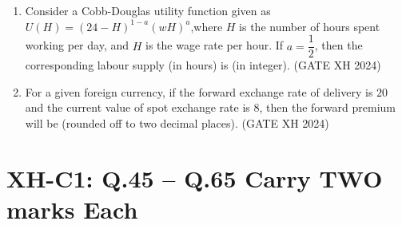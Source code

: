 \documentclass{article}
\begin{document}
\begin{enumerate}
    \item Consider a Cobb-Douglas utility function given as $U(H)=(24-H)^{1-a}(wH)^a$,where $H$ is the number of hours spent working per day, and $H$ is the wage rate per hour. If $a=\dfrac{1}{2}$, then the corresponding labour supply (in hours) is \makebox[1cm]{\hrulefill} (in integer). \hfill (GATE XH 2024)

    \item For a given foreign currency, if the forward exchange rate of delivery is $20$ and the current value of spot exchange rate is $8$, then the forward premium will be \makebox[1cm]{\hrulefill} (rounded off to two decimal places). \hfill (GATE XH 2024)

\end{enumerate}

\section*{XH-C1: Q.45 – Q.65 Carry TWO marks Each}
\end{document}
